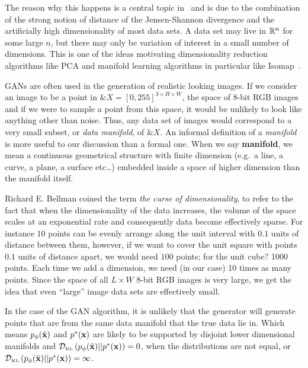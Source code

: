 
The reason why this happens is a central topic
in~\cite{ref:arjovsky-towards-2017} and is due to the combination of
the strong notion of distance of the Jensen-Shannon divergence and the
artificially high dimensionality of most data sets.  A data set may
live in $\mathbb{R}^n$ for some large $n$, but there may only be variation of
interest in a small number of dimensions. This is one of the ideas
motivating dimensionality reduction algorithms like PCA and manifold
learning algorithms in particular like
Isomap~\cite{ref:tenenbaum-2000}.

GANs are often used in the generation of realistic looking images. If
we consider an image to be a point in
$\&X = {[0, 255]}^{3 \times H \times W}$, the space of 8-bit RGB
images and if we were to sample a point from this space, it would be
unlikely to look like anything other than noise. Thus, any data set of
images would correspond to a very small subset, or \textit{data
  manifold}, of $\&X$. An informal definition of a \textit{manifold}
is more useful to our discussion than a formal one. When we say
\textbf{manifold}, we mean a continuous geometrical structure with
finite dimension (e.g.\ a line, a curve, a plane, a surface etc\dots)
embedded inside a space of higher dimension than the manifold itself.

Richard E. Bellman coined the term \textit{the curse of
  dimensionality}, to refer to the fact that when the dimensionality
of the data increases, the volume of the space scales at an
exponential rate and consequently data become effectively sparse. For
instance $10$ points can be evenly arrange along the unit interval
with $0.1$ units of distance between them, however, if we want to
cover the unit square with points $0.1$ units of distance apart, we
would need $100$ points; for the unit cube? 1000 points. Each time we
add a dimension, we need (in our case) 10 times as many points. Since
the space of all $L \times W$ 8-bit RGB images is very large, we get
the idea that even ``large'' image data sets are effectively small.

In the case of the GAN algorithm, it is unlikely that the generator
will generate points that are from the same data manifold that the
true data lie in. Which means $p_{\phi}(\tilde{\mathbf{x}})$ and $p^*(\mathbf{x})$ are likely to be
supported by disjoint lower dimensional manifolds and
$\mathcal{D}_{\text{\tiny KL}}\left( p_{\phi}(\tilde{\mathbf{x}}) \middle| \middle| p^*(\mathbf{x}) \right) = 0$, when the distributions are not equal, or
$\mathcal{D}_{\text{\tiny KL}}\left( p_{\phi}(\tilde{\mathbf{x}}) \middle| \middle| p^*(\mathbf{x}) \right) = \infty$.

